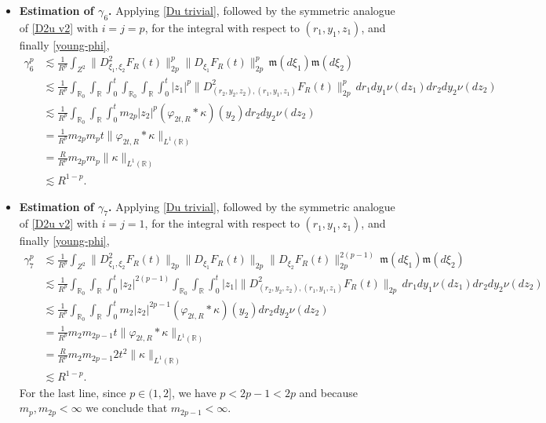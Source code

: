 \documentclass[12pt]{article}
\def\bR{\mathbb{R}}
\newcommand{\les}{\lesssim}
\def\k{\kappa}
\newcommand{\fm}{\mathfrak{m}}
\begin{document}
\begin{itemize}
\item {\bf Estimation of $\gamma_6$.} Applying \eqref{Du trivial}, followed by the symmetric analogue of \eqref{D2u v2} with $i = j = p$, for the integral with respect to $(r_1,y_1,z_1)$, and finally \eqref{young-phi},
\begin{align*}
  \gamma_6^p & \les \frac{1}{R^p}  \int_{Z^2} \| D^2_{\xi_1,\xi_2} F_R(t) \|_{2p}^{p}
 \| D_{\xi_1}F_R(t) \|_{2p}^p
\, \fm(d\xi_1)\fm(d\xi_2) \\
& \les \frac{1}{R^p} \int_{\bR_0} \int_{\bR} \int_0^t \int_{\bR_0} \int_{\bR} \int_0^t |z_1|^p \| D^2_{(r_2,y_2,z_2),(r_1,y_1,z_1)}  F_R(t) \|_{2p}^{p}
\, dr_1 dy_1 \nu(dz_1) dr_2 dy_2 \nu(dz_2) \\
& \les \frac{1}{R^p}  \int_{\bR_0} \int_{\bR} \int_{0}^t m_{2p}|z_2|^{p} (\varphi_{2t,R}*\k)(y_2) dr_2 dy_2 \nu(dz_2) \\
& = \frac{1}{R^p} m_{2p}m_p t \| \varphi_{2t,R} * \k \|_{L^{1}(\bR)} \\
& = \frac{R}{R^p} m_{2p}m_p  \|\k\|_{L^1(\bR)} \\
& \les R^{1-p}.
\end{align*}

\item {\bf Estimation of $\gamma_7$.} Applying \eqref{Du trivial}, followed by the symmetric analogue of \eqref{D2u v2} with $i = j = 1$, for the integral with respect to $(r_1,y_1,z_1)$, and finally \eqref{young-phi},
\begin{align*}
  \gamma_7^p & \les \frac{1}{R^p}  \int_{Z^2} \| D^2_{\xi_1,\xi_2}  F_R(t) \|_{2p}
 \| D_{\xi_1}F_R(t) \|_{2p}\| D_{\xi_2}F_R(t) \|_{2p}^{2(p-1)}
\, \fm(d\xi_1)\fm(d\xi_2) \\
& \les \frac{1}{R^p}  \int_{\bR_0} \int_{\bR} \int_{0}^t |z_2|^{2(p-1)}\int_{\bR_0} \int_{\bR} \int_{0}^t|z_1| \| D^2_{(r_2,y_2,z_2),(r_1,y_1,z_1)}  F_R(t) \|_{2p}
\, dr_1 dy_1 \nu(dz_1) dr_2 dy_2 \nu(dz_2) \\
& \les \frac{1}{R^p}  \int_{\bR_0} \int_{\bR} \int_{0}^t m_{2}|z_2|^{2p-1} ( \varphi_{2t,R} * \k)(y_2) dr_2 dy_2 \nu(dz_2) \\
& = \frac{1}{R^p} m_2m_{2p-1} t \| \varphi_{2t,R} * \k \|_{L^1(\bR)} \\
& = \frac{R}{R^p} m_2m_{2p-1} 2t^2 \|\k\|_{L^1(\bR)} \\
& \les  R^{1-p}.
\end{align*}
For the last line, since $p \in (1,2]$, we have $p < 2p-1 < 2p$ and because $m_p,m_{2p} < \infty$ we conclude that $m_{2p-1} < \infty$.
\end{itemize}
\end{document}
